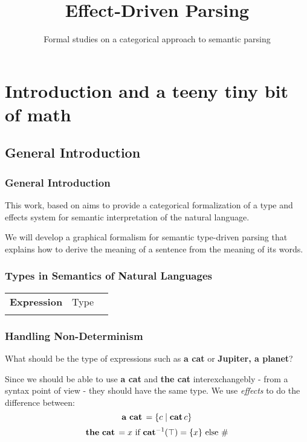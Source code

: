 \documentclass[math, english, info]{beamercours}
\title{Effect-Driven Parsing}
\subtitle{Formal studies on a categorical approach to semantic parsing}
\institute{École Normale Supérieure | Yale University}
\begin{document}
\maketitle

\section{Introduction and a teeny tiny bit of math}
\subsection{General Introduction}
\begin{frame}
	\frametitle{General Introduction}
	This work, based on \cite{bumfordEffectdrivenInterpretationFunctors2025} aims
	to provide a categorical formalization of a type and effects system for
	semantic interpretation of the natural language.

	\medskip

	We will develop a graphical formalism for semantic type-driven parsing that
	explains how to derive the meaning of a sentence from the meaning of its
	words.
\end{frame}

\begin{frame}[fragile]
	\frametitle{Types in Semantics of Natural Languages}
	\setcellgapes{3pt}
	\makegapedcells
	\begin{NiceTabular}{>{\bf}LLL}
		Expression & \rm Type & \lambda{} \\
		\CodeAfter
	\end{NiceTabular}
\end{frame}

\begin{frame}[fragile]
	\frametitle{Handling Non-Determinism}
	What should be the type of expressions such as \textbf{a cat} or \textbf{Jupiter, a planet}?
	\pause

	\smallskip

	Since we should be able to use \textbf{a cat} and \textbf{the cat} interexchangebly - from a syntax point of view - they should have the same type.
	We use \emph{effects} to do the difference between:
	\begin{equation*}
		\mathbf{a\ cat}\, = \{c \mid \mathbf{cat}\, c\}
	\end{equation*}
	\begin{equation*}
		\mathbf{the\ cat}\, = x \text{ if } \mathbf{cat}^{-1}(\top) = \{x\} \text{ else } \#
	\end{equation*}
\end{frame}
\end{document}

